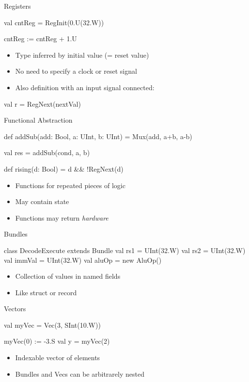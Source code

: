 \documentclass[xcolor=pdflatex,dvipsnames,table]{beamer}
\begin{document}
\begin{frame}[fragile]{Registers}
\begin{chisel}
val cntReg = RegInit(0.U(32.W))

cntReg := cntReg + 1.U
\end{chisel}
\begin{itemize}
\item Type inferred by initial value (= reset value)
\item No need to specify a clock or reset signal
\end{itemize}
\begin{itemize}
\item Also definition with an input signal connected:
\end{itemize}
\begin{chisel}
val r = RegNext(nextVal) 
\end{chisel}
\end{frame}

\begin{frame}[fragile]{Functional Abstraction}
\begin{chisel}
  def addSub(add: Bool, a: UInt, b: UInt) =
    Mux(add, a+b, a-b)

  val res = addSub(cond, a, b)
  
  def rising(d: Bool) = d && !RegNext(d)
\end{chisel}
\begin{itemize}
\item Functions for repeated pieces of logic
\item May contain state
\item Functions may return \emph{hardware}
\end{itemize}
\end{frame}


\begin{frame}[fragile]{Bundles}
\begin{chisel}
class DecodeExecute extends Bundle {
  val rs1 = UInt(32.W)
  val rs2 = UInt(32.W)
  val immVal = UInt(32.W)
  val aluOp = new AluOp()
}
\end{chisel}
\begin{itemize}
\item Collection of values in named fields 
\item Like struct or record
\end{itemize}
\end{frame}

\begin{frame}[fragile]{Vectors}
\begin{chisel}
val myVec = Vec(3, SInt(10.W))

myVec(0) := -3.S
val y = myVec(2)
\end{chisel}
\begin{itemize}
\item Indexable vector of elements
\item Bundles and Vecs can be arbitrarely nested
\end{itemize}
\end{frame}
\end{document}
